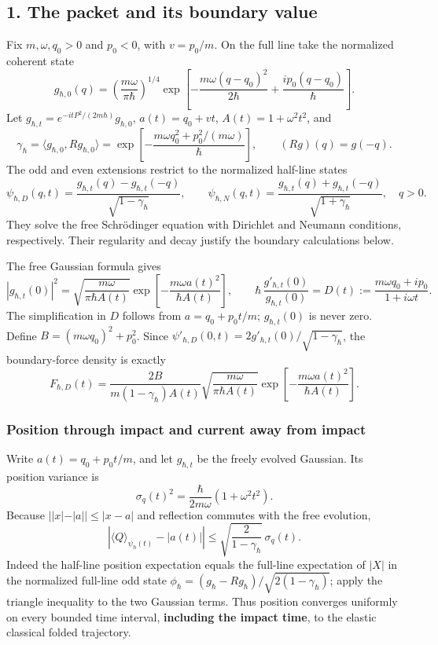 \documentclass[11pt,a4paper]{article}
\begin{document}
\subsection{1. The packet and its boundary
value}\label{the-packet-and-its-boundary-value}

Fix \(m,\omega,q_0>0\) and \(p_0<0\), with \(v=p_0/m\). On the full line
take the normalized coherent state \[
 g_{\hbar,0}(q)=\left(\frac{m\omega}{\pi\hbar}\right)^{1/4}
  \exp\!\left[-\frac{m\omega(q-q_0)^2}{2\hbar}
       +\frac{i p_0(q-q_0)}{\hbar}\right].
\] Let \(g_{\hbar,t}=e^{-itP^2/(2m\hbar)}g_{\hbar,0}\), \(a(t)=q_0+vt\),
\(A(t)=1+\omega^2t^2\), and \[
 \gamma_\hbar=\langle g_{\hbar,0},Rg_{\hbar,0}\rangle
 =\exp\!\left[-\frac{m\omega q_0^2+p_0^2/(m\omega)}{\hbar}\right],
 \qquad (Rg)(q)=g(-q).\tag{2}
\] The odd and even extensions restrict to the normalized half-line
states \[
 \psi_{\hbar,D}(q,t)
   =\frac{g_{\hbar,t}(q)-g_{\hbar,t}(-q)}{\sqrt{1-\gamma_\hbar}},
 \qquad
 \psi_{\hbar,N}(q,t)
   =\frac{g_{\hbar,t}(q)+g_{\hbar,t}(-q)}{\sqrt{1+\gamma_\hbar}},
 \quad q>0.\tag{3}
\] They solve the free Schrödinger equation with Dirichlet and Neumann
conditions, respectively. Their regularity and decay justify the
boundary calculations below.

The free Gaussian formula gives \[
 |g_{\hbar,t}(0)|^2
 =\sqrt{\frac{m\omega}{\pi\hbar A(t)}}
    \exp\!\left[-\frac{m\omega a(t)^2}{\hbar A(t)}\right],\qquad
 \hbar\,\frac{g'_{\hbar,t}(0)}{g_{\hbar,t}(0)}
 =D(t):=\frac{m\omega q_0+i p_0}{1+i\omega t}.\tag{4}
\] The simplification in \(D\) follows from \(a=q_0+p_0t/m\);
\(g_{\hbar,t}(0)\) is never zero. Define \(B=(m\omega q_0)^2+p_0^2\).
Since \(\psi'_{\hbar,D}(0,t)=2g'_{\hbar,t}(0)/\sqrt{1-\gamma_\hbar}\),
the boundary-force density is exactly \[
 F_{\hbar,D}(t)
 =\frac{2B}{m(1-\gamma_\hbar)A(t)}
    \sqrt{\frac{m\omega}{\pi\hbar A(t)}}
    \exp\!\left[-\frac{m\omega a(t)^2}{\hbar A(t)}\right].\tag{5}
\]

\subsubsection{Position through impact and current away from
impact}\label{position-through-impact-and-current-away-from-impact}

Write \(a(t)=q_0+p_0t/m\), and let \(g_{\hbar,t}\) be the freely evolved
Gaussian. Its position variance is
\[\sigma_q(t)^2=\frac{\hbar}{2m\omega}(1+\omega^2t^2).\tag{P21}\]
Because \(||x|-|a||\le|x-a|\) and reflection commutes with the free
evolution, \[
 \left|\langle Q\rangle_{\psi_\hbar(t)}-|a(t)|\right|
 \le\sqrt{\frac{2}{1-\gamma_\hbar}}\,\sigma_q(t).\tag{P22}
\] Indeed the half-line position expectation equals the full-line
expectation of \(|X|\) in the normalized full-line odd state
\(\phi_\hbar=(g_\hbar-Rg_\hbar)/\sqrt{2(1-\gamma_\hbar)}\); apply the
triangle inequality to the two Gaussian terms. Thus position converges
uniformly on every bounded time interval, \textbf{including the impact
time}, to the elastic classical folded trajectory.
\end{document}
